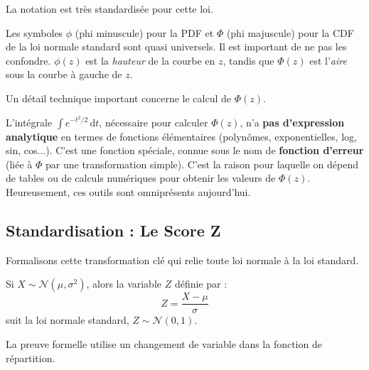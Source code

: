 La notation est très standardisée pour cette loi.

\begin{remarquebox}
Les symboles $\phi$ (phi minuscule) pour la PDF et $\Phi$ (phi majuscule) pour la CDF de la loi normale standard sont quasi universels. Il est important de ne pas les confondre. $\phi(z)$ est la \textit{hauteur} de la courbe en $z$, tandis que $\Phi(z)$ est l'\textit{aire} sous la courbe à gauche de $z$.
\end{remarquebox}

Un détail technique important concerne le calcul de $\Phi(z)$.

\begin{remarquebox}
L'intégrale $\int e^{-t^2/2} \, \mathrm{d}t$, nécessaire pour calculer $\Phi(z)$, n'a \textbf{pas d'expression analytique} en termes de fonctions élémentaires (polynômes, exponentielles, log, sin, cos...). C'est une fonction spéciale, connue sous le nom de \textbf{fonction d'erreur} (liée à $\Phi$ par une transformation simple). C'est la raison pour laquelle on dépend de tables ou de calculs numériques pour obtenir les valeurs de $\Phi(z)$. Heureusement, ces outils sont omniprésents aujourd'hui.
\end{remarquebox}

\subsection{Standardisation : Le Score Z}

Formalisons cette transformation clé qui relie toute loi normale à la loi standard.

\begin{theorembox}
Si $X \sim \mathcal{N}(\mu, \sigma^2)$, alors la variable $Z$ définie par :
$$ Z = \frac{X - \mu}{\sigma} $$
suit la loi normale standard, $Z \sim \mathcal{N}(0, 1)$.
\end{theorembox}

La preuve formelle utilise un changement de variable dans la fonction de répartition.

